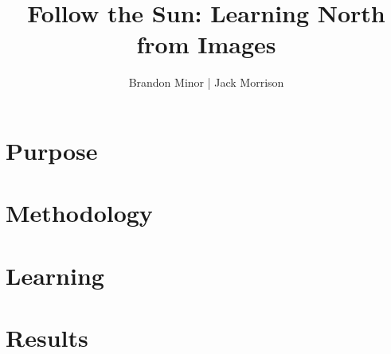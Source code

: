 \documentclass{article}
\begin{document}
\title{Follow the Sun: Learning North from Images}
\author{Brandon Minor | Jack Morrison}
\maketitle

\section{Purpose}



\section{Methodology}





\section{Learning}






\section{Results}
\end{document}

